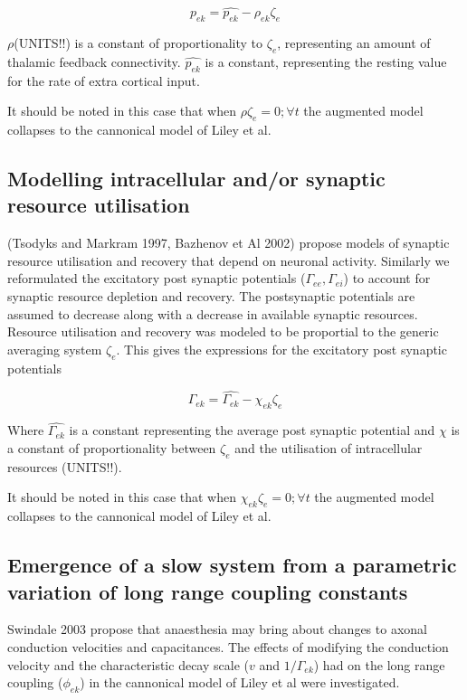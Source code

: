 \documentclass[a4paper,12pt]{article}
\begin{document}
\begin{equation}
p_{ek} = \hat{p_{ek}} - \rho_{ek} \zeta_e
\end{equation}

$\rho$(UNITS!!) is a constant of proportionality to $\zeta_e$, representing an amount of thalamic feedback connectivity. $\hat{p_{ek}}$ is a constant, representing
the resting value for the rate of extra cortical input. 

It should be noted in this case that when $\rho\zeta_e=0; \forall t$ the augmented model collapses to the cannonical model of Liley et al.

\subsection{Modelling intracellular and/or synaptic resource utilisation}
(Tsodyks and Markram 1997, Bazhenov et Al 2002) propose models of synaptic resource utilisation and recovery that depend
on neuronal activity. Similarly we reformulated the excitatory post synaptic potentials ($\Gamma_{ee}, \Gamma_{ei}$) to
account for synaptic resource depletion and recovery.
The postsynaptic potentials are assumed to decrease along with a decrease in available synaptic resources. Resource
utilisation and recovery was modeled to be proportial to the generic averaging system $\zeta_{e}$. This gives the expressions for
the excitatory post synaptic potentials

\begin{equation}
\Gamma_{ek} = \hat{\Gamma_{ek}} - \chi_{ek} \zeta_e
\end{equation}

Where $\hat{\Gamma_{ek}}$ is a constant representing the average post synaptic potential and $\chi$ is a constant of proportionality between $\zeta_e$ and the utilisation of intracellular resources (UNITS!!).

It should be noted in this case that when $\chi_{ek} \zeta_e=0; \forall t$ the augmented model collapses to the cannonical model of Liley et al.

\subsection{Emergence of a slow system from a parametric variation of long range coupling constants}


Swindale 2003 propose that anaesthesia may bring about changes to axonal conduction velocities and capacitances. The
effects of modifying the conduction velocity and the characteristic decay scale ($v$ and $1 / \Gamma_{ek}$) had on the
long range coupling ($\phi_{ek}$) in the cannonical model of Liley et al were investigated.
\end{document}
